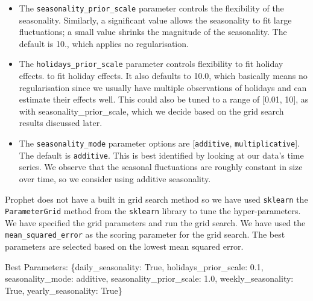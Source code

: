 \documentclass[mstat,12pt]{unswthesis}
\newenvironment{Shaded}{\begin{snugshade}}{\end{snugshade}}
\newcommand{\FloatTok}[1]{\textcolor[rgb]{0.00,0.00,0.81}{#1}}
\newcommand{\NormalTok}[1]{#1}
\newcommand{\StringTok}[1]{\textcolor[rgb]{0.31,0.60,0.02}{#1}}
\newcommand{\VariableTok}[1]{\textcolor[rgb]{0.00,0.00,0.00}{#1}}
\begin{document}
\begin{itemize}
\item
  The \texttt{seasonality\_prior\_scale} parameter controls the
  flexibility of the seasonality. Similarly, a significant value allows
  the seasonality to fit large fluctuations; a small value shrinks the
  magnitude of the seasonality. The default is 10., which applies no
  regularisation.
\item
  The \texttt{holidays\_prior\_scale} parameter controls flexibility to
  fit holiday effects. to fit holiday effects. It also defaults to 10.0,
  which basically means no regularisation since we usually have multiple
  observations of holidays and can estimate their effects well. This
  could also be tuned to a range of {[}0.01, 10{]}, as with
  seasonality\_prior\_scale, which we decide based on the grid search
  results discussed later.
\item
  The \texttt{seasonality\_mode} parameter options are
  {[}\texttt{\textquotesingle{}additive\textquotesingle{}},
  \texttt{\textquotesingle{}multiplicative\textquotesingle{}}{]}. The
  default is \texttt{\textquotesingle{}additive\textquotesingle{}}. This
  is best identified by looking at our data's time series. We observe
  that the seasonal fluctuations are roughly constant in size over time,
  so we consider using additive seasonality.
\end{itemize}

Prophet does not have a built in grid search method so we have used
\texttt{sklearn} the \texttt{ParameterGrid} method from the
\texttt{sklearn} library to tune the hyper-parameters. We have specified
the grid parameters and run the grid search. We have used the
\texttt{mean\_squared\_error} as the scoring parameter for the grid
search. The best parameters are selected based on the lowest mean
squared error.

\begin{Shaded}
\begin{Highlighting}[]
\NormalTok{Best Parameters: \{}\StringTok{\textquotesingle{}daily\_seasonality\textquotesingle{}}\NormalTok{: }\VariableTok{True}\NormalTok{, }
                  \StringTok{\textquotesingle{}holidays\_prior\_scale\textquotesingle{}}\NormalTok{: }\FloatTok{0.1}\NormalTok{, }
                  \StringTok{\textquotesingle{}seasonality\_mode\textquotesingle{}}\NormalTok{: }\StringTok{\textquotesingle{}additive\textquotesingle{}}\NormalTok{, }
                  \StringTok{\textquotesingle{}seasonality\_prior\_scale\textquotesingle{}}\NormalTok{: }\FloatTok{1.0}\NormalTok{, }
                  \StringTok{\textquotesingle{}weekly\_seasonality\textquotesingle{}}\NormalTok{: }\VariableTok{True}\NormalTok{, }
                  \StringTok{\textquotesingle{}yearly\_seasonality\textquotesingle{}}\NormalTok{: }\VariableTok{True}\NormalTok{\}}
\end{Highlighting}
\end{Shaded}
\end{document}
